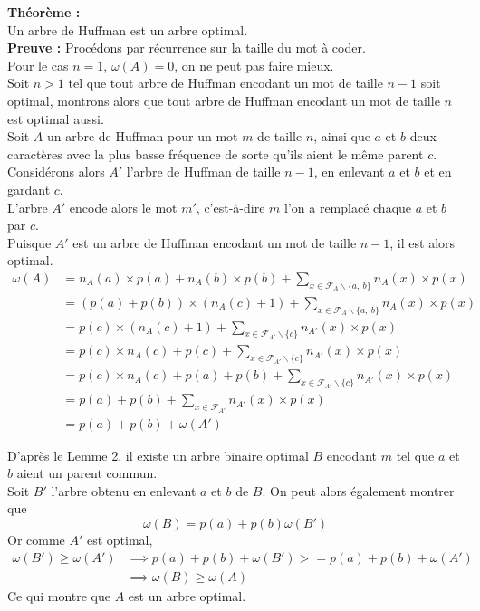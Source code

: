 \documentclass[a4paper, 12pt]{article}
\let\qed\square
\begin{document}
\newpage
\textbf{Théorème :} \\
Un arbre de Huffman est un arbre optimal. \\

\textbf{Preuve :}
Procédons par récurrence sur la taille du mot à coder. \\
Pour le cas $n = 1$, $\omega(A) = 0$, on ne peut pas faire mieux. \\
Soit $n > 1$ tel que tout arbre de Huffman encodant un mot de taille $n-1$ soit optimal, montrons alors que tout arbre de Huffman encodant un mot de taille $n$ est optimal aussi. \\
Soit $A$ un arbre de Huffman pour un mot $m$ de taille $n$, ainsi que $a$ et $b$ deux caractères avec la plus basse fréquence de sorte qu'ils aient le même parent $c$. \\
Considérons alors $A'$ l'arbre de Huffman de taille $n-1$, en enlevant $a$ et $b$ et en gardant $c$. \\
L'arbre $A'$ encode alors le mot $m'$, c'est-à-dire $m$ l'on a remplacé chaque $a$ et $b$ par $c$. \\
Puisque $A'$ est un arbre de Huffman encodant un mot de taille $n-1$, il est alors optimal.
\begin{align*}
\omega(A) &= n_A(a)\times p(a) + n_A(b)\times p(b)+\sum_{x\in \mathcal{F}_A\backslash\{a,\ b\}} n_A(x)\times p(x)‎‎ \\
&= (p(a)+p(b))\times(n_A(c)+1)+\sum_{x\in \mathcal{F}_A\backslash\{a,\ b\}} n_A(x)\times p(x)‎‎ \\
&= p(c)\times(n_A(c)+1)+\sum_{x\in \mathcal{F}_{A'}\backslash\{c\}} n_{A'}(x)\times p(x)‎‎ \\
&= p(c)\times n_A(c)+p(c)+\sum_{x\in \mathcal{F}_{A'}\backslash\{c\}} n_{A'}(x)\times p(x)‎‎ \\
&= p(c)\times n_A(c)+p(a)+p(b)+\sum_{x\in \mathcal{F}_{A'}\backslash\{c\}} n_{A'}(x)\times p(x)‎‎ \\
&= p(a)+p(b)+\sum_{x\in \mathcal{F}_{A'}} n_{A'}(x)\times p(x)‎‎ \\
&= p(a)+p(b)+\omega(A')
\end{align*}

D'après le Lemme 2, il existe un arbre binaire optimal $B$ encodant $m$ tel que $a$ et $b$ aient un parent commun. \\ 
Soit $B'$ l'arbre obtenu en enlevant $a$ et $b$ de $B$. On peut alors également montrer que
$$
\omega(B) = p(a)+p(b)\omega(B')
$$
Or comme $A'$ est optimal,
\begin{align*}
\omega(B') \geq \omega(A') &\implies p(a)+p(b)+\omega(B') >= p(a)+p(b)+\omega(A') \\
&\implies \omega(B) \geq \omega(A)
\end{align*}
Ce qui montre que $A$ est un arbre optimal. \qed \\
\end{document}
